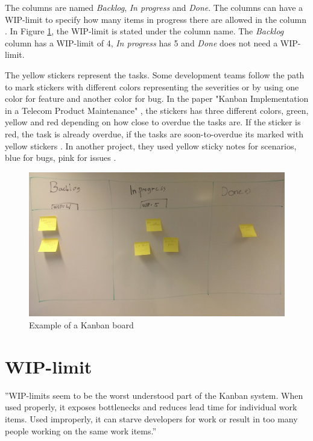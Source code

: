 \documentclass[UKenglish]{ifimaster}  %
\begin{document}
The columns are named \textit{Backlog}, \textit{In progress} and \textit{Done}.  The columns can have a WIP-limit to specify how many items in progress there are allowed in the column \parencite{Joyce}. In Figure \ref{kanban_board}, the WIP-limit is stated under the column name. The \textit{Backlog} column has a WIP-limit of 4, \textit{In progress} has 5 and \textit{Done} does not need a WIP-limit. 

The yellow stickers represent the tasks. Some development teams follow the path to mark stickers with different colors representing the severities or by using one color for feature and another color for bug. In the paper "Kanban Implementation in a Telecom Product Maintenance" \parencite{6068363}, the stickers has three different colors, green, yellow and red depending on how close to overdue the tasks are. If the sticker is red, the task is already overdue, if the tasks are soon-to-overdue its marked with yellow stickers . In another project, they used yellow sticky notes for scenarios, blue for bugs, pink for issues \parencite{Shinkle}.
\begin{figure}[!htbp]
\centering
\includegraphics[width=\textwidth]{Picture/kanban_board.jpg}
\caption{Example of a Kanban board}
\label{kanban_board}
\end{figure}

\section{WIP-limit}
\label{WIPsec}
''WIP-limits seem to be the worst understood part of the Kanban system. When used properly, it exposes bottlenecks and reduces lead time for individual work items. Used improperly, it can starve developers for work or result in too many people working on the same work items.'' \parencite{Shinkle}
\end{document}
